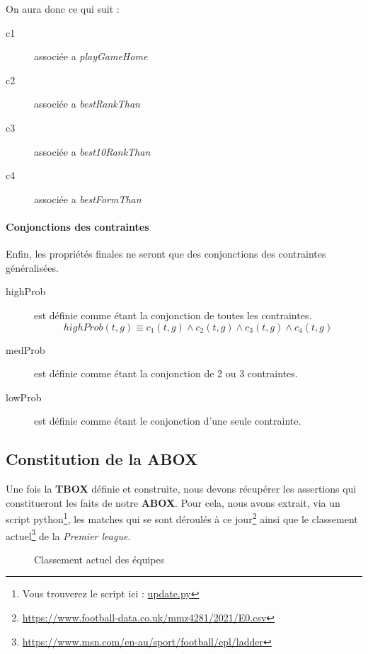 \documentclass[oneside,13pt,a4paper]{article}
\begin{document}


On aura donc ce qui suit :
\begin{description}
  \item[c1] associée a \textit{playGameHome}
  \item[c2] associée a \textit{bestRankThan}
  \item[c3] associée a \textit{best10RankThan}
  \item[c4] associée a \textit{bestFormThan}
\end{description}

\paragraph{Conjonctions des contraintes}

Enfin, les propriétés finales ne seront que des conjonctions des contraintes généralisées.

\begin{description}
  \item[highProb] est définie comme étant la conjonction de toutes les contraintes. 
  \[highProb(t,g) \equiv c_1(t,g) \wedge c_2(t,g) \wedge c_3(t,g) \wedge c_4(t,g)\]
  \item[medProb] est définie comme étant la conjonction de 2 ou 3 contraintes.
  \item[lowProb] est définie comme étant le conjonction d'une seule contrainte.
\end{description}

\subsection{Constitution de la ABOX}

Une fois la \textbf{TBOX} définie et construite, nous devons récupérer les assertions qui constitueront les faits de notre \textbf{ABOX}. Pour cela, nous avons extrait, via un script python\footnote{Vous trouverez le script ici : \href{../db/update.py}{update.py}}, les matches qui se sont déroulés à ce jour\footnote{\url{https://www.football-data.co.uk/mmz4281/2021/E0.csv}} ainsi que le classement actuel\footnote{\url{https://www.msn.com/en-au/sport/football/epl/ladder}} de la \textit{Premier league}.

\begin{figure}[!h]
	\centering
    
    \caption{Classement actuel des équipes}    
\end{figure}
       
\end{document}
